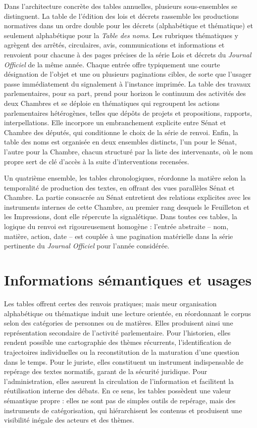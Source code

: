 Dans l’architecture concrète des tables annuelles, plusieurs sous-ensembles se distinguent. La table de l’édition des lois et décrets rassemble les productions normatives dans un ordre double pour les décrets (alphabétique et thématique) et seulement alphabétique pour la \emph{Table des noms}. Les rubriques thématiques y agrègent des arrêtés, circulaires, avis, communications et informations et renvoient pour chacune à des pages précises de la série Lois et décrets du \emph{Journal Officiel} de la même année. Chaque entrée offre typiquement une courte désignation de l’objet et une ou plusieurs paginations cibles, de sorte que l’usager passe immédiatement du signalement à l’instance imprimée. La table des travaux parlementaires, pour sa part, prend pour horizon le continuum des activités des deux Chambres et se déploie en thématiques qui regroupent les actions parlementaires hétérogènes, telles que dépôts de projets et propositions, rapports, interpellations. Elle incorpore un embranchement explicite entre Sénat et Chambre des députés, qui conditionne le choix de la série de renvoi. Enfin, la table des noms est organisée en deux ensembles distincts, l’un pour le Sénat, l’autre pour la Chambre, chacun structuré par la liste des intervenants, où le nom propre sert de clé d’accès à la suite d’interventions recensées.

Un quatrième ensemble, les tables chronologiques, réordonne la matière selon la temporalité de production des textes, en offrant des vues parallèles Sénat et Chambre. La partie consacrée au Sénat entretient des relations explicites avec les instruments internes de cette Chambre, au premier rang desquels le Feuilleton et les Impressions, dont elle répercute la signalétique. Dans toutes ces tables, la logique du renvoi est rigoureusement homogène : l’entrée abstraite – nom, matière, action, date – est couplée à une pagination matérielle dans la série pertinente du \emph{Journal Officiel} pour l’année considérée.

\section{Informations sémantiques et usages}

Les tables offrent certes des renvois pratiques; mais meur organisation alphabétique ou thématique induit une lecture orientée, en réordonnant le corpus selon des catégories de personnes ou de matières. Elles produisent ainsi une représentation secondaire de l’activité parlementaire. Pour l’historien, elles rendent possible une cartographie des thèmes récurrents, l’identification de trajectoires individuelles ou la reconstitution de la maturation d’une question dans le temps. Pour le juriste, elles constituent un instrument indispensable de repérage des textes normatifs, garant de la sécurité juridique. Pour l’administration, elles assurent la circulation de l’information et facilitent la réutilisation interne des débats. En ce sens, les tables possèdent une valeur sémantique propre : elles ne sont pas de simples outils de repérage, mais des instruments de catégorisation, qui hiérarchisent les contenus et produisent une visibilité inégale des acteurs et des thèmes.

